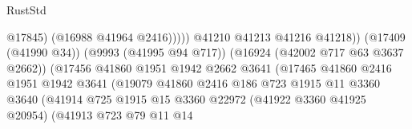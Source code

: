 \begin{lexlean}{RustStd}
\begin{coremodule}
                                                              @17845)
                                                            (@16988 @41964 @2416)))))
                                                    @41210
                                                    @41213
                                                    @41216
                                                    @41218))
                                                (@17409 (@41990 @34))
                                                (@9993 (@41995 @94 @717))
                                                (@16924 (@42002 @717 @63 @3637 @2662))
                                                (@17456
                                                  @41860
                                                  @1951
                                                  @1942
                                                  @2662
                                                  @3641
                                                  (@17465
                                                    @41860
                                                    @2416
                                                    @1951
                                                    @1942
                                                    @3641
                                                    (@19079
                                                      @41860
                                                      @2416
                                                      @186
                                                      @723
                                                      @1915
                                                      @11
                                                      @3360
                                                      @3640
                                                      (@41914
                                                        @725
                                                        @1915
                                                        @15
                                                        @3360
                                                        @22972
                                                        (@41922 @3360 @41925 @20954)
                                                        (@41913
                                                          @723
                                                          @79
                                                          @11
                                                          @14

\end{coremodule}
\end{lexlean}
